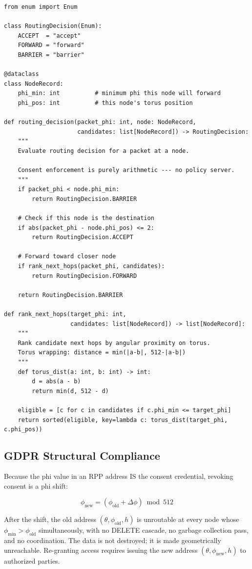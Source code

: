 \documentclass[11pt,a4paper]{article}
\begin{document}
\begin{lstlisting}[style=python,caption={Consent-Field Routing Decision}]
from enum import Enum

class RoutingDecision(Enum):
    ACCEPT  = "accept"
    FORWARD = "forward"
    BARRIER = "barrier"

@dataclass
class NodeRecord:
    phi_min: int          # minimum phi this node will forward
    phi_pos: int          # this node's torus position

def routing_decision(packet_phi: int, node: NodeRecord,
                     candidates: list[NodeRecord]) -> RoutingDecision:
    """
    Evaluate routing decision for a packet at a node.

    Consent enforcement is purely arithmetic --- no policy server.
    """
    if packet_phi < node.phi_min:
        return RoutingDecision.BARRIER

    # Check if this node is the destination
    if abs(packet_phi - node.phi_pos) <= 2:
        return RoutingDecision.ACCEPT

    # Forward toward closer node
    if rank_next_hops(packet_phi, candidates):
        return RoutingDecision.FORWARD

    return RoutingDecision.BARRIER

def rank_next_hops(target_phi: int,
                   candidates: list[NodeRecord]) -> list[NodeRecord]:
    """
    Rank candidate next hops by angular proximity on torus.
    Torus wrapping: distance = min(|a-b|, 512-|a-b|)
    """
    def torus_dist(a: int, b: int) -> int:
        d = abs(a - b)
        return min(d, 512 - d)

    eligible = [c for c in candidates if c.phi_min <= target_phi]
    return sorted(eligible, key=lambda c: torus_dist(target_phi, c.phi_pos))
\end{lstlisting}

\subsection{GDPR Structural Compliance}

Because the phi value in an RPP address IS the consent credential, revoking consent is a phi shift:

\begin{equation}
\phi_{\text{new}} = (\phi_{\text{old}} + \Delta\phi) \bmod 512
\end{equation}

After the shift, the old address $(\theta, \phi_{\text{old}}, h)$ is unroutable at every node whose $\phi_{\min} > \phi_{\text{old}}$ simultaneously, with no DELETE cascade, no garbage collection pass, and no coordination. The data is not destroyed; it is made geometrically unreachable. Re-granting access requires issuing the new address $(\theta, \phi_{\text{new}}, h)$ to authorized parties.
\end{document}

